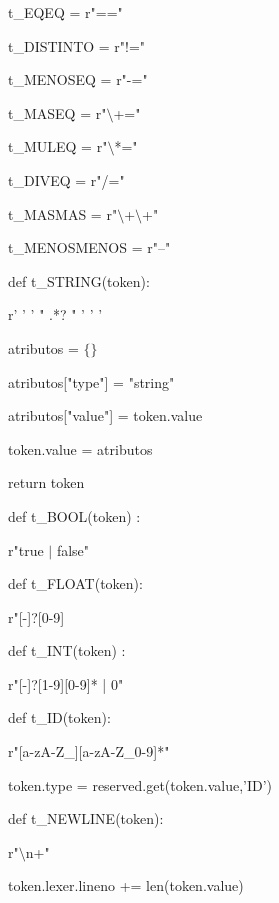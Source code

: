 \begin{multicols}{2}

t\_EQEQ = r"=="

t\_DISTINTO = r"!="

t\_MENOSEQ = r"-="

t\_MASEQ = r"$\setminus$+="

t\_MULEQ = r"$\setminus$*="

t\_DIVEQ = r"/="

t\_MASMAS = r"$\setminus$+$\setminus$+"

t\_MENOSMENOS = r"--"

\columnbreak

def t\_STRING(token):

\hspace{5mm}    r' ' ' " .*? " ' ' '
    
\hspace{5mm}    atributos = $\{ \} $
    
\hspace{5mm}    atributos["type"] = "string"
    
\hspace{5mm}    atributos["value"] = token.value
    
\hspace{5mm}    token.value = atributos
    
\hspace{5mm}    return token
 
\end{multicols} 
    
   
\begin{multicols}{2}   

def t\_BOOL(token) : 

\hspace{5mm}    r"true $|$ false"
    
    
def t\_FLOAT(token):

\hspace{5mm}    r"[-]?[0-9] 
    
def t\_INT(token) : 

\hspace{5mm}    r"[-]?[1-9][0-9]* | 0"
    
\columnbreak

def t\_ID(token):

\hspace{5mm}    r"[a-zA-Z\_][a-zA-Z\_0-9]*"
    
\hspace{5mm}    token.type = reserved.get(token.value,'ID')


def t\_NEWLINE(token):

\hspace{5mm}  r"$\setminus$n+"
  
\hspace{5mm}  token.lexer.lineno += len(token.value)
  
\end{multicols}

